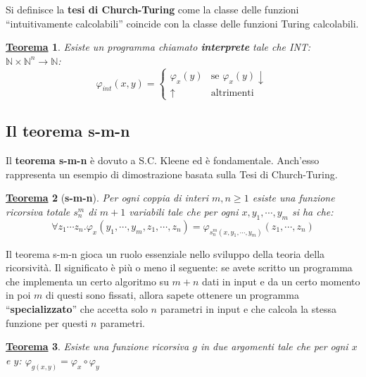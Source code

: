 \documentclass[a4paper]{article}
\newtheorem{theorem}{\textcolor{Red3}{\underline{Teorema}}}
\newcommand{\dquotes}[1]{``#1''}
\begin{document}
	\noindent
	Si definisce la \textcolor{Red3}{\textbf{tesi di Church-Turing}} come la classe delle funzioni \dquotes{intuitivamente calcolabili} coincide con la classe delle funzioni Turing calcolabili.\newline
	\begin{theorem}
		Esiste un programma chiamato \textcolor{Red3}{\textbf{interprete}} tale che INT: $\mathbb{N} \times \mathbb{N}^{n} \rightarrow \mathbb{N}$:
		\begin{equation*}
			\varphi_{int}\left(x,y\right) = \begin{cases}
				\varphi_{x}\left(y\right)	& \text{se } \varphi_{x}\left(y\right)\downarrow \\
				\uparrow					& \text{altrimenti}
			\end{cases}
		\end{equation*}
	\end{theorem}\newpage

	\subsection{Il teorema s-m-n}
	
	Il \textcolor{Red3}{\textbf{teorema s-m-n}} è dovuto a S.C. Kleene ed è fondamentale. Anch'esso rappresenta un esempio di dimostrazione basata sulla Tesi di Church-Turing.
	\begin{theorem}[\textbf{s-m-n}]
		Per ogni coppia di interi $m,n \ge 1$ esiste una funzione ricorsiva totale $s_{n}^{m}$ di $m+1$ variabili tale che per ogni $x, y_{1}, \cdots, y_{m}$ si ha che:
		\begin{equation*}
			\forall z_{1} \cdots z_{n}. \varphi_{x}\left(y_{1}, \cdots, y_{m}, z_{1}, \cdots, z_{n}\right) = \varphi_{s_{n}^{m}\left(x,y_{1}, \cdots, y_{m}\right)} \left(z_{1}, \cdots, z_{n}\right)
		\end{equation*}
	\end{theorem}
	\noindent
	Il teorema s-m-n gioca un ruolo essenziale nello sviluppo della teoria della ricorsività. Il significato è più o meno il seguente: se avete scritto un programma che implementa un certo algoritmo su $m+n$ dati in input e da un certo momento in poi $m$ di questi sono fissati, allora sapete ottenere un programma \dquotes{\textbf{specializzato}} che accetta solo $n$ parametri in input e che calcola la stessa funzione per questi $n$ parametri.
	\begin{theorem}
		Esiste una funzione ricorsiva $g$ in due argomenti tale che per ogni $x$ e $y$: $\varphi_{g\left(x,y\right)} = \varphi_{x} \circ \varphi_{y}$
	\end{theorem}
\end{document}

